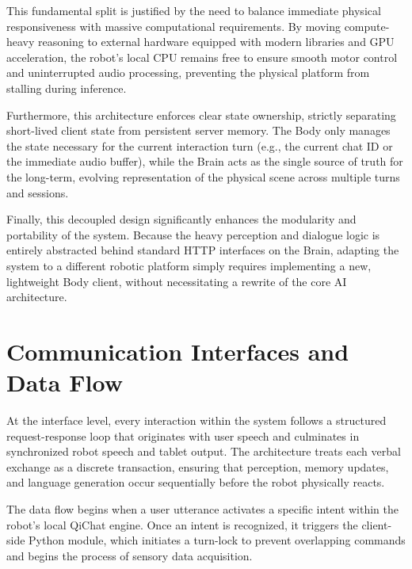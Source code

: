 This fundamental split is justified by the need to balance immediate physical responsiveness with massive computational requirements. By moving compute-heavy reasoning to external hardware equipped with modern libraries and GPU acceleration, the robot's local CPU remains free to ensure smooth motor control and uninterrupted audio processing, preventing the physical platform from stalling during inference.

Furthermore, this architecture enforces clear state ownership, strictly separating short-lived client state from persistent server memory. The Body only manages the state necessary for the current interaction turn (e.g., the current chat ID or the immediate audio buffer), while the Brain acts as the single source of truth for the long-term, evolving representation of the physical scene across multiple turns and sessions.

Finally, this decoupled design significantly enhances the modularity and portability of the system. Because the heavy perception and dialogue logic is entirely abstracted behind standard HTTP interfaces on the Brain, adapting the system to a different robotic platform simply requires implementing a new, lightweight Body client, without necessitating a rewrite of the core AI architecture.

\section{Communication Interfaces and Data Flow}\label{sec:communication_data_flow}

At the interface level, every interaction within the system follows a structured request-response loop that originates with user speech and culminates in synchronized robot speech and tablet output. The architecture treats each verbal exchange as a discrete transaction, ensuring that perception, memory updates, and language generation occur sequentially before the robot physically reacts.

The data flow begins when a user utterance activates a specific intent within the robot's local QiChat engine. Once an intent is recognized, it triggers the client-side Python module, which initiates a turn-lock to prevent overlapping commands and begins the process of sensory data acquisition.

